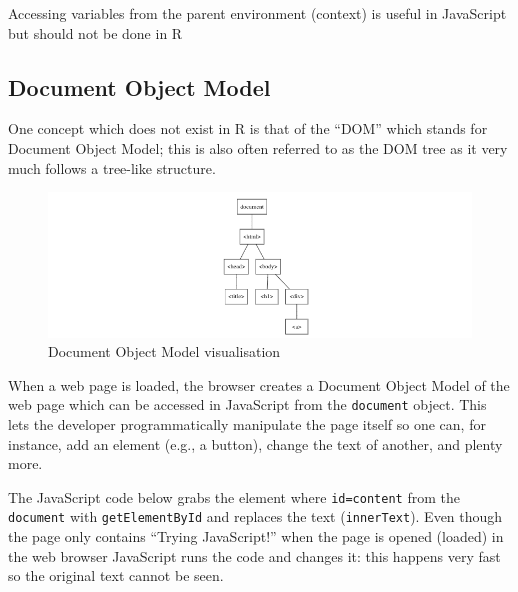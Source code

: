 \documentclass[10pt,]{krantz}
\makeatletter
\newenvironment{kframe}{%
\medskip{}
\setlength{\fboxsep}{.8em}
 \def\at@end@of@kframe{}%
 \ifinner\ifhmode%
  \def\at@end@of@kframe{\end{minipage}}%
  \begin{minipage}{\columnwidth}%
 \fi\fi%
 \def\FrameCommand##1{\hskip\@totalleftmargin \hskip-\fboxsep
 \colorbox{shadecolor}{##1}\hskip-\fboxsep
     \hskip-\linewidth \hskip-\@totalleftmargin \hskip\columnwidth}%
 \MakeFramed {\advance\hsize-\width
   \@totalleftmargin\z@ \linewidth\hsize
   \@setminipage}}%
 {\par\unskip\endMakeFramed%
 \at@end@of@kframe}
\newenvironment{rmdblock}[1]
  {
  \begin{itemize}
  \renewcommand{\labelitemi}{
    \raisebox{-.7\height}[0pt][0pt]{
      {\setkeys{Gin}{width=3em,keepaspectratio}\texttt{[image: images/\#1]}}
    }
  }
  \setlength{\fboxsep}{1em}
  \begin{kframe}
  \item
  }
  {
  \end{kframe}
  \end{itemize}
  }
\newenvironment{rmdnote}
  {\begin{rmdblock}{note}}
  {\end{rmdblock}}
\makeatother
\begin{document}
\begin{rmdnote}
Accessing variables from the parent environment (context) is useful in
JavaScript but should not be done in R
\end{rmdnote}

\hypertarget{basics-object-model}{%
\subsection{Document Object Model}\label{basics-object-model}}

One concept which does not exist in R is that of the ``DOM'' which stands for Document Object Model; this is also often referred to as the DOM tree as it very much follows a tree-like structure.

\begin{figure}[H]

{\centering \includegraphics[width=1\linewidth]{images/02-dom-viz} 

}

\caption{Document Object Model visualisation}\label{fig:dom-viz}
\end{figure}

When a web page is loaded, the browser creates a Document Object Model of the web page which can be accessed in JavaScript from the \texttt{document} object. This lets the developer programmatically manipulate the page itself so one can, for instance, add an element (e.g., a button), change the text of another, and plenty more.

The JavaScript code below grabs the element where \texttt{id=\textquotesingle{}content\textquotesingle{}} from the \texttt{document} with \texttt{getElementById} and replaces the text (\texttt{innerText}). Even though the page only contains ``Trying JavaScript!'' when the page is opened (loaded) in the web browser JavaScript runs the code and changes it: this happens very fast so the original text cannot be seen.
\end{document}
